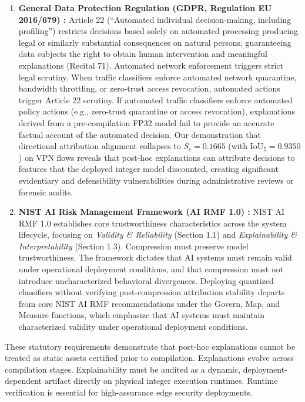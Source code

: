 \documentclass[conference]{IEEEtran}
\begin{document}
\begin{enumerate}
    \item \textbf{General Data Protection Regulation (GDPR, Regulation EU 2016/679) \cite{b7}:} Article 22 (``Automated individual decision-making, including profiling'') restricts decisions based solely on automated processing producing legal or similarly substantial consequences on natural persons, guaranteeing data subjects the right to obtain human intervention and meaningful explanations (Recital 71). Automated network enforcement triggers strict legal scrutiny. When traffic classifiers enforce automated network quarantine, bandwidth throttling, or zero-trust access revocation, automated actions trigger Article 22 scrutiny. If automated traffic classifiers enforce automated policy actions (e.g., zero-trust quarantine or access revocation), explanations derived from a pre-compilation FP32 model fail to provide an accurate factual account of the automated decision. Our demonstration that directional attribution alignment collapses to $S_c = 0.1665$ (with $\text{IoU}_5 = 0.9350$) on VPN flows reveals that post-hoc explanations can attribute decisions to features that the deployed integer model discounted, creating significant evidentiary and defensibility vulnerabilities during administrative reviews or forensic audits.
    \item \textbf{NIST AI Risk Management Framework (AI RMF 1.0) \cite{b9}:} NIST AI RMF 1.0 establishes core trustworthiness characteristics across the system lifecycle, focusing on \textit{Validity \& Reliability} (Section 1.1) and \textit{Explainability \& Interpretability} (Section 1.3). Compression must preserve model trustworthiness. The framework dictates that AI systems must remain valid under operational deployment conditions, and that compression must not introduce uncharacterized behavioral divergences. Deploying quantized classifiers without verifying post-compression attribution stability departs from core NIST AI RMF recommendations under the Govern, Map, and Measure functions, which emphasize that AI systems must maintain characterized validity under operational deployment conditions.
\end{enumerate}

These statutory requirements demonstrate that post-hoc explanations cannot be treated as static assets certified prior to compilation. Explanations evolve across compilation stages. Explainability must be audited as a dynamic, deployment-dependent artifact directly on physical integer execution runtimes. Runtime verification is essential for high-assurance edge security deployments.
\end{document}
